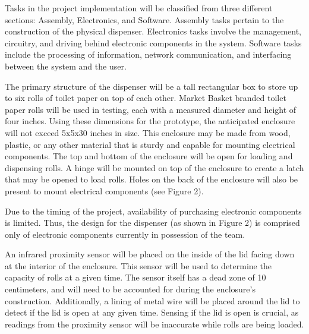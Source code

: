 \par Tasks in the project implementation will be classified from three different sections: Assembly, Electronics, and Software. Assembly tasks pertain to the construction of the physical dispenser. Electronics tasks involve the management, circuitry, and driving behind electronic components in the system. Software tasks include the processing of information, network communication, and interfacing between the system and the user.

\par The primary structure of the dispenser will be a tall rectangular box to store up to six rolls of toilet paper on top of each other. Market Basket branded toilet paper rolls will be used in testing, each with a measured diameter and height of four inches. Using these dimensions for the prototype, the anticipated enclosure will not exceed 5x5x30 inches in size. This enclosure may be made from wood, plastic, or any other material that is sturdy and capable for mounting electrical components. The top and bottom of the enclosure will be open for loading and dispensing rolls. A hinge will be mounted on top of the enclosure to create a latch that may be opened to load rolls. Holes on the back of the enclosure will also be present to mount electrical components (see Figure 2).

\par Due to the timing of the project, availability of purchasing electronic components is limited. Thus, the design for the dispenser (as shown in Figure 2) is comprised only of electronic components currently in possession of the team.

\par An infrared proximity sensor will be placed on the inside of the lid facing down at the interior of the enclosure. This sensor will be used to determine the capacity of rolls at a given time. The sensor itself has a dead zone of 10 centimeters, and will need to be accounted for during the enclosure's construction. Additionally, a lining of metal wire will be placed around the lid to detect if the lid is open at any given time. Sensing if the lid is open is crucial, as readings from the proximity sensor will be inaccurate while rolls are being loaded.


